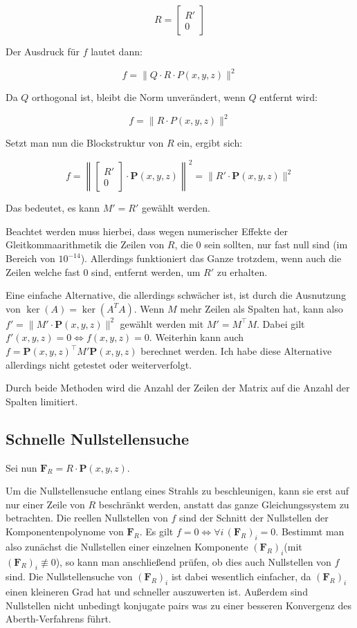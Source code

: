 \documentclass[
	ngerman,%
	accentcolor=9c,%
	ruledheaders=section,%
	class=report,%
	thesis={type=bachelor},%
	fontsize=11pt,%
	parskip=half-,%
	custommargins=true,%
	marginpar=false,%
]{tudapub}
\begin{document}
\[
R = \begin{bmatrix} R' \\ 0 \end{bmatrix}
\]

Der Ausdruck für \( f \) lautet dann:

\[
f = \|Q \cdot R \cdot P(x, y, z)\|^2
\]

Da \( Q \) orthogonal ist, bleibt die Norm unverändert, wenn \( Q \) entfernt wird:

\[
f = \|R \cdot P(x, y, z)\|^2
\]

Setzt man nun die Blockstruktur von \( R \) ein, ergibt sich:

\[
f = \left\|\begin{bmatrix} R' \\ 0 \end{bmatrix} \cdot  \mathbf{P}(x, y, z)\right\|^2 = \|R' \cdot  \mathbf{P}(x, y, z)\|^2
\]

Das bedeutet, es kann \( M' = R' \) gewählt werden.

Beachtet werden muss hierbei, dass wegen numerischer Effekte der Gleitkommaarithmetik die Zeilen von \( R \), die 0 sein sollten, nur fast null sind (im Bereich von  \( 10^{-14} \)). Allerdings funktioniert das Ganze trotzdem, wenn auch die Zeilen welche fast 0 sind, entfernt werden, um \( R' \) zu erhalten.

Eine einfache Alternative, die allerdings schwächer ist, ist durch die Ausnutzung von 
\(\ker(A) = \ker(A^TA)\).
Wenn \(M\) mehr Zeilen als Spalten hat, kann also \(f' = \|M' \cdot  \mathbf{P}(x, y, z)\|^2\) gewählt werden mit \(M' = M^\top M\). 
Dabei gilt \(f'(x,y,z)=0 \iff f(x,y,z)=0\). Weiterhin kann auch \(f =  \mathbf{P}(x, y, z)^\top M'  \mathbf{P}(x, y, z)\) berechnet werden.
Ich habe diese Alternative allerdings nicht getestet oder weiterverfolgt.


Durch beide Methoden wird die Anzahl der Zeilen der Matrix auf die Anzahl der Spalten limitiert.

\subsection{Schnelle Nullstellensuche}
\label{sec:Schnelle_Nullstellensuche}

Sei nun \(\mathbf{F}_R=R \cdot  \mathbf{P}(x,y,z)\).

Um die Nullstellensuche entlang eines Strahls zu beschleunigen, kann sie erst auf nur einer Zeile von \(R\) beschränkt werden, anstatt das ganze Gleichungssystem zu betrachten. Die reellen Nullstellen von \(f\) sind der Schnitt der Nullstellen der Komponentenpolynome von 
\(\mathbf{F}_R\). Es gilt \(f = 0 \iff \forall i\, (\mathbf{F}_R)_i = 0\). Bestimmt man also zunächst die Nullstellen einer einzelnen Komponente \((\mathbf{F}_R)_i\)(mit \((\mathbf{F}_R)_i \not\equiv 0\)), so kann man anschließend prüfen, ob dies auch Nullstellen von \(f\) sind. Die Nullstellensuche von \((\mathbf{F}_R)_i\) ist dabei wesentlich einfacher, da \((\mathbf{F}_R)_i\) einen kleineren Grad hat und schneller auszuwerten ist. Außerdem sind Nullstellen nicht unbedingt konjugate pairs was zu einer besseren Konvergenz des Aberth-Verfahrens führt.
\end{document}
